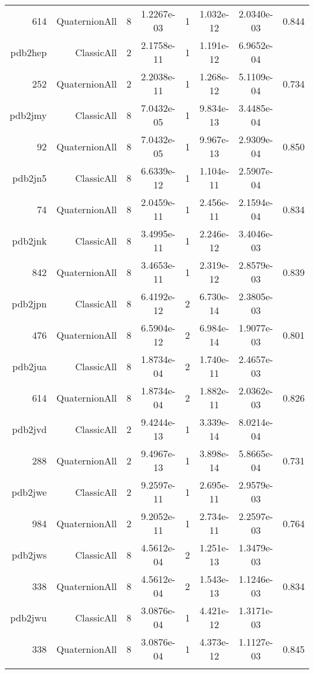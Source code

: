 \begin{xltabular}{\textwidth}{r|rcS[table-format=1.4e+2]cS[table-format=1.3e+2]S[table-format=1.4e+2]S[table-format=-1.3]}
614 & QuaternionAll & 8 & 1.2267e-03 & 1 & 1.032e-12 & 2.0340e-03 & 0.844\\  \addlinespace
pdb2hep & ClassicAll & 2 & 2.1758e-11 & 1 & 1.191e-12 & 6.9652e-04 & \\
252 & QuaternionAll & 2 & 2.2038e-11 & 1 & 1.268e-12 & 5.1109e-04 & 0.734\\  \addlinespace
pdb2jmy & ClassicAll & 8 & 7.0432e-05 & 1 & 9.834e-13 & 3.4485e-04 & \\
92 & QuaternionAll & 8 & 7.0432e-05 & 1 & 9.967e-13 & 2.9309e-04 & 0.850\\  \addlinespace
pdb2jn5 & ClassicAll & 8 & 6.6339e-12 & 1 & 1.104e-11 & 2.5907e-04 & \\
74 & QuaternionAll & 8 & 2.0459e-11 & 1 & 2.456e-11 & 2.1594e-04 & 0.834\\  \addlinespace
pdb2jnk & ClassicAll & 8 & 3.4995e-11 & 1 & 2.246e-12 & 3.4046e-03 & \\
842 & QuaternionAll & 8 & 3.4653e-11 & 1 & 2.319e-12 & 2.8579e-03 & 0.839\\  \addlinespace
pdb2jpn & ClassicAll & 8 & 6.4192e-12 & 2 & 6.730e-14 & 2.3805e-03 & \\
476 & QuaternionAll & 8 & 6.5904e-12 & 2 & 6.984e-14 & 1.9077e-03 & 0.801\\  \addlinespace
pdb2jua & ClassicAll & 8 & 1.8734e-04 & 2 & 1.740e-11 & 2.4657e-03 & \\
614 & QuaternionAll & 8 & 1.8734e-04 & 2 & 1.882e-11 & 2.0362e-03 & 0.826\\  \addlinespace
pdb2jvd & ClassicAll & 2 & 9.4244e-13 & 1 & 3.339e-14 & 8.0214e-04 & \\
288 & QuaternionAll & 2 & 9.4967e-13 & 1 & 3.898e-14 & 5.8665e-04 & 0.731\\  \addlinespace
pdb2jwe & ClassicAll & 2 & 9.2597e-11 & 1 & 2.695e-11 & 2.9579e-03 & \\
984 & QuaternionAll & 2 & 9.2052e-11 & 1 & 2.734e-11 & 2.2597e-03 & 0.764\\  \addlinespace
pdb2jws & ClassicAll & 8 & 4.5612e-04 & 2 & 1.251e-13 & 1.3479e-03 & \\
338 & QuaternionAll & 8 & 4.5612e-04 & 2 & 1.543e-13 & 1.1246e-03 & 0.834\\  \addlinespace
pdb2jwu & ClassicAll & 8 & 3.0876e-04 & 1 & 4.421e-12 & 1.3171e-03 & \\
338 & QuaternionAll & 8 & 3.0876e-04 & 1 & 4.373e-12 & 1.1127e-03 & 0.845\\  \addlinespace

\end{xltabular}
